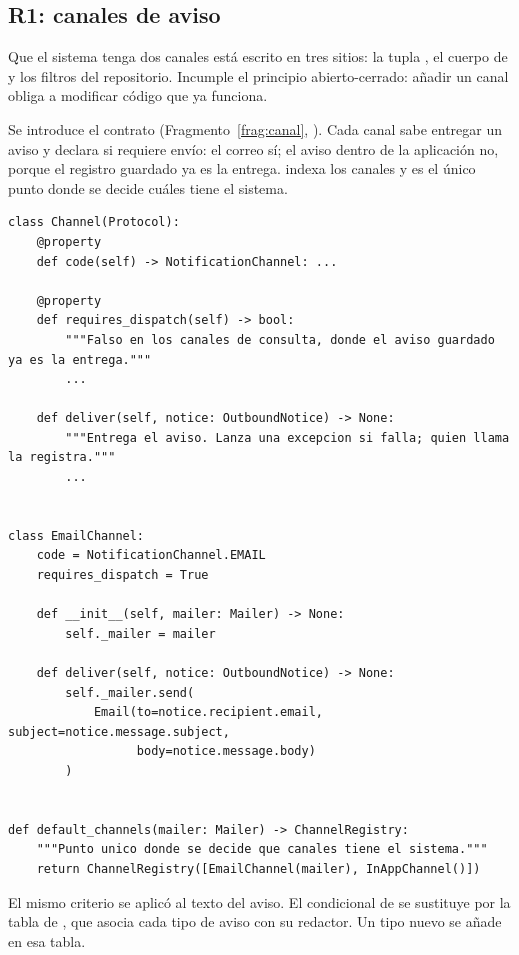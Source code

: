 \documentclass[11pt,a4paper]{article}
\begin{document}
\subsection{R1: canales de aviso}

 Que el sistema tenga dos canales está escrito en tres sitios: la tupla , el cuerpo de  y los filtros del repositorio. Incumple el principio abierto-cerrado: añadir un canal obliga a modificar código que ya funciona.

 Se introduce el contrato  (Fragmento~\ref{frag:canal}, ). Cada canal sabe entregar un aviso y declara si requiere envío: el correo sí; el aviso dentro de la aplicación no, porque el registro guardado ya es la entrega.  indexa los canales y  es el único punto donde se decide cuáles tiene el sistema.

\begin{lstlisting}[float=htbp,caption={\ev{E-07}. Contrato de canal y canal de correo (\cod{services/channels.py}).},label=frag:canal]
class Channel(Protocol):
    @property
    def code(self) -> NotificationChannel: ...

    @property
    def requires_dispatch(self) -> bool:
        """Falso en los canales de consulta, donde el aviso guardado ya es la entrega."""
        ...

    def deliver(self, notice: OutboundNotice) -> None:
        """Entrega el aviso. Lanza una excepcion si falla; quien llama la registra."""
        ...


class EmailChannel:
    code = NotificationChannel.EMAIL
    requires_dispatch = True

    def __init__(self, mailer: Mailer) -> None:
        self._mailer = mailer

    def deliver(self, notice: OutboundNotice) -> None:
        self._mailer.send(
            Email(to=notice.recipient.email, subject=notice.message.subject,
                  body=notice.message.body)
        )


def default_channels(mailer: Mailer) -> ChannelRegistry:
    """Punto unico donde se decide que canales tiene el sistema."""
    return ChannelRegistry([EmailChannel(mailer), InAppChannel()])
\end{lstlisting}

El mismo criterio se aplicó al texto del aviso. El condicional de  se sustituye por la tabla  de , que asocia cada tipo de aviso con su redactor. Un tipo nuevo se añade en esa tabla.
\end{document}
